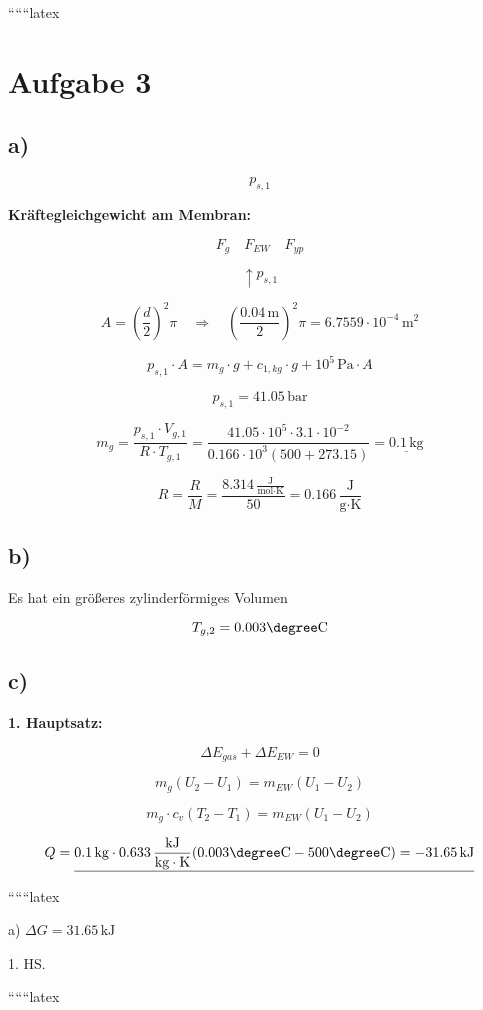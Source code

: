 
``````latex


\section*{Aufgabe 3}

\subsection*{a)}

\[
p_{s,1}
\]

\textbf{Kräftegleichgewicht am Membran:}

\[
F_g \quad F_{EW} \quad F_{yp}
\]

\[
\uparrow p_{s,1}
\]

\[
A = \left(\frac{d}{2}\right)^2 \pi \quad \Rightarrow \quad \left(\frac{0.04 \, \text{m}}{2}\right)^2 \pi = 6.7559 \cdot 10^{-4} \, \text{m}^2
\]

\[
p_{s,1} \cdot A = m_g \cdot g + c_{1,kg} \cdot g + 10^5 \, \text{Pa} \cdot A
\]

\[
p_{s,1} = 41.05 \, \text{bar}
\]

\[
m_g = \frac{p_{s,1} \cdot V_{g,1}}{R \cdot T_{g,1}} = \frac{41.05 \cdot 10^5 \cdot 3.1 \cdot 10^{-2}}{0.166 \cdot 10^3 \left(500 + 273.15\right)} = \underline{0.1 \, \text{kg}}
\]

\[
R = \frac{R}{M} = \frac{8.314 \, \frac{\text{J}}{\text{mol} \cdot \text{K}}}{50} = 0.166 \, \frac{\text{J}}{\text{g} \cdot \text{K}}
\]

\subsection*{b)}

Es hat ein größeres zylinderförmiges Volumen

\[
T_{g,2} = 0.003 \degree \text{C}
\]

\subsection*{c)}

\textbf{1. Hauptsatz:}

\[
\Delta E_{gas} + \Delta E_{EW} = 0
\]

\[
m_g (U_2 - U_1) = m_{EW} (U_1 - U_2)
\]

\[
m_g \cdot c_v (T_2 - T_1) = m_{EW} (U_1 - U_2)
\]

\[
Q = \underline{0.1 \, \text{kg} \cdot 0.633 \, \frac{\text{kJ}}{\text{kg} \cdot \text{K}} (0.003 \degree \text{C} - 500 \degree \text{C}) = -31.65 \, \text{kJ}}
\]

``````latex


a) \(\Delta G = 31.65 \, \text{kJ}\)

1. HS.

``````latex


